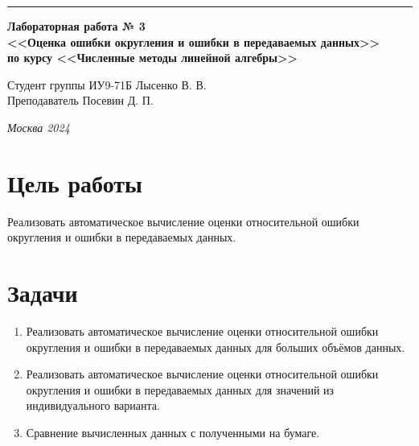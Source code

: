 \documentclass[a4paper, 14pt]{extarticle}
\begin{document}
\begin{titlepage}
\vspace*{-16pt}
\hspace{30pt}\rule{0.866\textwidth}{0.4pt}
  
\vspace{11em}

\begin{center}
\Large {\bf Лабораторная работа № 3} \\ 
\large {\bf<<Оценка ошибки округления и ошибки в передаваемых данных>>} \\ 
\large {\bf по курсу <<Численные методы линейной алгебры>>} \\ 
\end{center}\normalsize

\vspace{8em}


\begin{flushright}
  {Студент группы ИУ9-71Б Лысенко В. В.\hspace*{15pt} \\
  \vspace{2ex}
  Преподаватель Посевин Д. П.\hspace*{15pt}}
\end{flushright}

\bigskip

\vfill
 

\begin{center}
\textsl{Москва 2024}
\end{center}
\end{titlepage}

\renewcommand{\ttdefault}{pcr}

\setlength{\tabcolsep}{3pt}
\newpage
\setcounter{page}{2}

\section{Цель работы}\label{Sect::task}
\par
\renewcommand{\labelenumii}{\arabic{enumi}.\arabic{enumii}.}
Реализовать автоматическое вычисление оценки относительной ошибки округления и ошибки в передаваемых данных.

\section{Задачи}\label{Sect::task}
\par
\renewcommand{\labelenumii}{\arabic{enumi}.\arabic{enumii}.}
\begin{enumerate} 
    \item Реализовать автоматическое вычисление оценки относительной ошибки округления и ошибки в передаваемых данных для больших объёмов данных.
    \item Реализовать автоматическое вычисление оценки относительной ошибки округления и ошибки в передаваемых данных для значений из индивидуального варианта. 
    \item Сравнение вычисленных данных с полученными на бумаге.
\end{enumerate}
\end{document}

